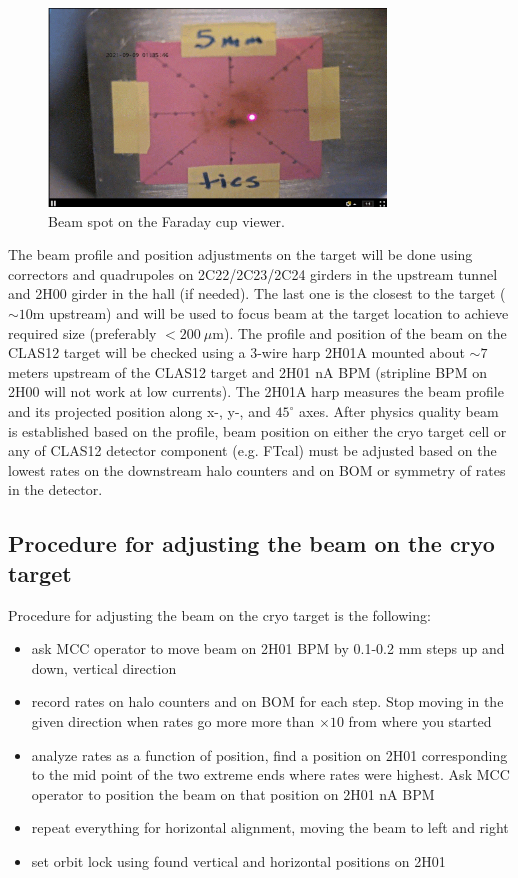 \begin{figure}[htb!]
\centering
\includegraphics[width=0.8\textwidth]{FC_viewer.pdf}
\caption{Beam spot on the Faraday cup viewer.}
\label{fig:FC_spot}
\end{figure}

The beam profile and position adjustments on the target will be done using correctors and quadrupoles on 2C22/2C23/2C24 girders in the upstream tunnel and 2H00 girder in the hall (if needed). The last one is the closest to the target ($\sim 10$m upstream) and will be used to focus beam at the target location to achieve required size (preferably $<200~\mu$m). The profile and position of the beam on the CLAS12 target will be checked using a 3-wire harp 2H01A mounted about $\sim 7$ meters upstream of the CLAS12 target and 2H01 nA BPM (stripline BPM on 2H00 will not work at low currents). The 2H01A harp measures the beam profile and its projected position along x-, y-, and $45^\circ$ axes. After physics quality beam is established based on the profile, beam position on either the cryo target cell or any of CLAS12 detector component (e.g. FTcal) must be adjusted based on the lowest rates on the downstream halo counters and on BOM or symmetry of rates in the detector. 

\subsection{Procedure for adjusting the beam on the cryo target} 
Procedure for adjusting the beam on the cryo target is the following:
\begin{itemize}
\item ask MCC operator to move beam on 2H01 BPM by 0.1-0.2 mm steps up and down, vertical direction
\item record rates on halo counters and on BOM for each step. Stop moving in the given direction when rates go more more than $\times 10$ from where you started 
\item analyze rates as a function of position, find a position on 2H01 corresponding to the mid point of the two extreme ends where rates were highest. Ask MCC operator to position the beam on that position on 2H01 nA BPM
\item  repeat everything for horizontal alignment, moving the beam to left and right 
\item set orbit lock using found vertical and horizontal positions on 2H01 
\end{itemize}

